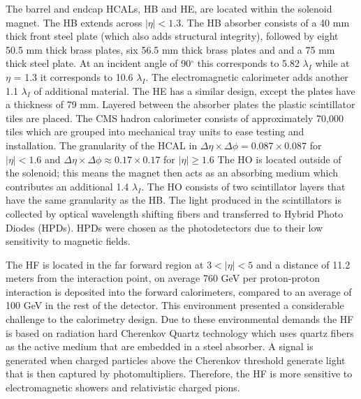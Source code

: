 The barrel and endcap HCALs, HB and HE, are located within the 
solenoid magnet. The HB extends across $|\eta|<1.3$.
The HB absorber consists of a 40 mm thick front steel plate (which also adds structural integrity),
followed by eight 50.5 mm thick brass plates, six 56.5 mm thick brass plates and
and a 75 mm thick steel plate. At an incident angle of 90$^{\circ}$ this corresponds 
to 5.82 $\lambda_{I}$ while at $\eta$ = 1.3 it corresponds to 10.6 $\lambda_{I}$.
The electromagnetic calorimeter adds another 1.1 $\lambda_{I}$ of additional
material. The HE has a similar design, except the plates have a thickness of 79 mm.
Layered between the absorber plates the plastic scintillator tiles are placed. The 
CMS hadron calorimeter consists of approximately 70,000 tiles which are grouped
into mechanical tray units to ease testing and installation.  
The granularity of the HCAL in $\Delta\eta \times \Delta\phi = 0.087 \times 0.087$
for $|\eta|<1.6$ and $\Delta\eta \times \Delta\phi \approx 0.17 \times 0.17$ for $|\eta|\ge1.6$
The HO is located outside of the solenoid; this means the magnet then acts as an absorbing
medium which contributes an additional 1.4 $\lambda_{I}$. The HO consists of two 
scintillator layers that have the same granularity as the HB. 
The light produced in the scintillators is collected by optical wavelength shifting fibers 
and transferred to Hybrid Photo Diodes (HPDs). HPDs were chosen as the photodetectors
due to their low sensitivity to magnetic fields. %

The HF is located in the far forward region at $3<|\eta|<5$ and a distance
of  11.2 meters from the interaction point, on average 760 GeV per 
proton-proton interaction is deposited into the forward calorimeters, compared
to an average of 100 GeV in the rest of the detector. This environment
presented a considerable challenge to the calorimetry design. Due to these 
environmental demands the HF is based on radiation hard Cherenkov Quartz technology
which uses quartz fibers as the active medium that are embedded in a steel absorber. 
A signal is generated when charged particles above the Cherenkov threshold %
generate light that is then captured by photomultipliers. Therefore, the HF is
more sensitive to electromagnetic showers and relativistic charged pions.
